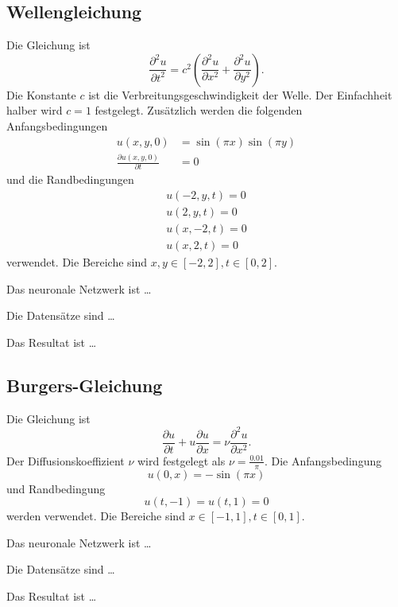 \subsection{Wellengleichung}\label{neuronal:subsection:wellengleichung}
Die Gleichung ist
\begin{equation}
    \frac{\partial^2 u}{\partial t^2} = c^2 \left( \frac{\partial^2 u}{\partial x^2} + \frac{\partial^2 u}{\partial y^2} \right).
    \label{neuronal:wellengleichung}
\end{equation}
Die Konstante \( c \) ist die Verbreitungsgeschwindigkeit der Welle. Der Einfachheit halber wird $c = 1$ festgelegt.
Zusätzlich werden die folgenden Anfangsbedingungen
\begin{equation}
    \begin{aligned}
        u(x, y, 0) &= \sin(\pi x) \sin(\pi y)\\
        \frac{\partial u(x, y, 0)}{\partial t} &= 0
    \end{aligned}
    \label{neuronal:wellen_anfangs}
\end{equation}
und die Randbedingungen
\begin{equation}
    \begin{aligned}
        u(-2, y, t) = 0\\
        u(2, y, t) = 0\\
        u(x, -2, t) = 0\\
        u(x, 2, t) = 0
    \end{aligned}
    \label{neuronal:wellen_rand}
\end{equation}
verwendet.
Die Bereiche sind \( x, y \in [-2,2], t \in [0,2] \).

Das neuronale Netzwerk ist \ldots

Die Datensätze sind \ldots

Das Resultat ist \ldots


\subsection{Burgers-Gleichung}\label{neuronal:subsection:burgers_gleichung}
Die Gleichung ist
\begin{equation}
    \frac{\partial u}{\partial t} + u \frac{\partial u}{\partial x} = \nu \frac{\partial^2 u}{\partial x^2}.
    \label{neuronal:burgers}
\end{equation}
Der Diffusionskoeffizient $\nu$ wird festgelegt als $\nu = \frac{0.01}{\pi}$.
Die Anfangsbedingung
\begin{equation}
    u(0, x) = - \sin(\pi x)
    \label{neuronal:burgers_anfang}
\end{equation}
und Randbedingung
\begin{equation}
    u(t, -1) = u(t, 1) = 0
    \label{neuronal:burgers_rand}
\end{equation}
werden verwendet.
Die Bereiche sind \( x \in [-1,1], t \in [0,1] \).


Das neuronale Netzwerk ist \ldots

Die Datensätze sind \ldots

Das Resultat ist \ldots
